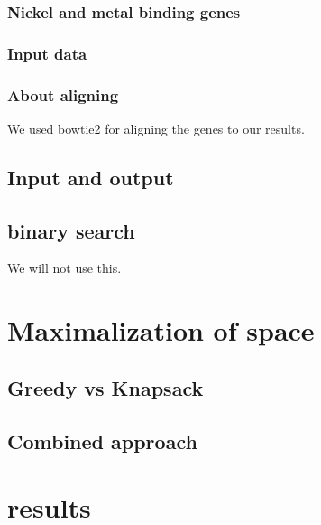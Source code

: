 \subsubsection{Nickel and metal binding genes}

\subsubsection{Input data}

\subsubsection{About aligning}
We used bowtie2 for aligning the genes to our results. 

\subsection{Input and output}

\subsection{binary search}
We will not use this. 

\section{Maximalization of space}

\subsection{Greedy vs Knapsack}

\subsection{Combined approach}

\section{results}


